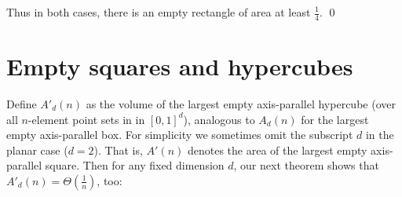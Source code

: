 \documentclass[11pt]{article}
\begin{document}
Thus in both cases, there is an empty rectangle of area at least $\frac{1}{4}$.
\qed



\section{Empty squares and hypercubes}\label{sec:square}

Define $A'_d(n)$ as the volume of the largest empty axis-parallel
hypercube (over all $n$-element point sets in in $[0,1]^d$), analogous
to $A_d(n)$ for the largest empty axis-parallel box.  
For simplicity we sometimes omit the subscript $d$ in the planar case
($d=2$).  That is, $A'(n)$ denotes the area of the largest empty 
axis-parallel square. Then for any fixed dimension $d$, our next
theorem shows that $A'_d(n) =\Theta\left(\frac{1}{n}\right)$, too: 
\end{document}
